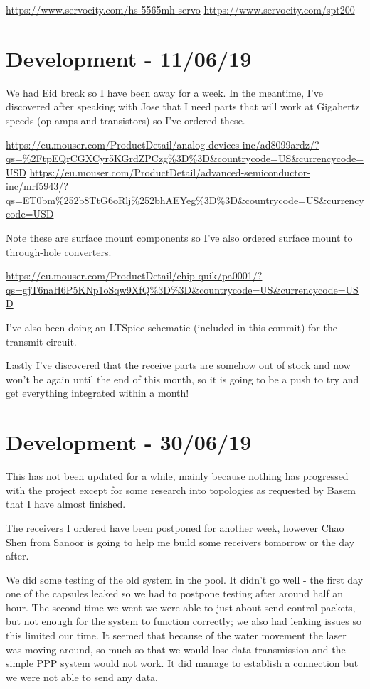 \url{https://www.servocity.com/hs-5565mh-servo}
\url{https://www.servocity.com/spt200}

\section{Development - 11/06/19}
We had Eid break so I have been away for a week. In the meantime, I've
discovered after speaking with Jose that I need parts that will work at
Gigahertz speeds (op-amps and transistors) so I've ordered these.

\url{https://eu.mouser.com/ProductDetail/analog-devices-inc/ad8099ardz/?qs=%2FtpEQrCGXCyr5KGrdZPCzg%3D%3D&countrycode=US&currencycode=USD}
\url{https://eu.mouser.com/ProductDetail/advanced-semiconductor-inc/mrf5943/?qs=ET0bm%252b8TtG6oRlj%252bhAEYeg%3D%3D&countrycode=US&currencycode=USD}

Note these are surface mount components so I've also ordered surface mount
to through-hole converters.

\url{https://eu.mouser.com/ProductDetail/chip-quik/pa0001/?qs=gjT6naH6P5KNp1oSqw9XfQ%3D%3D&countrycode=US&currencycode=USD}

I've also been doing an LTSpice schematic (included in this commit) for
the transmit circuit.

Lastly I've discovered that the receive parts are somehow out of stock
and now won't be again until the end of this month, so it is going to be a push
to try and get everything integrated within a month!

\section{Development - 30/06/19}
This has not been updated for a while, mainly because nothing has progressed
with the project except for some research into topologies as requested by
Basem that I have almost finished.

The receivers I ordered have been postponed for another week, however Chao Shen
from Sanoor is going to help me build some receivers tomorrow or the day after.

We did some testing of the old system in the pool. It didn't go well - the first
day one of the capsules leaked so we had to postpone testing after around half
an hour. The second time we went we were able to just about send control packets,
but not enough for the system to function correctly; we also had leaking issues
so this limited our time. It seemed that because of the water movement the laser
was moving around, so much so that we would lose data transmission and the
simple PPP system would not work. It did manage to establish a connection but
we were not able to send any data.

